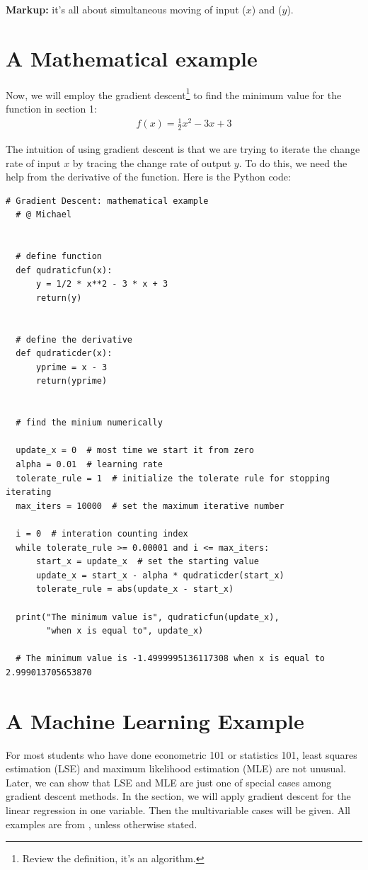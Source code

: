 \documentclass[12pt]{article}
\theoremstyle{definition}
\numberwithin{equation}{section}
\numberwithin{figure}{section}
\numberwithin{table}{section}
\begin{document}
\textbf{Markup:} it's all about simultaneous moving of input ($x$) and ($y$).

\section{A Mathematical example}

Now, we will employ the gradient descent\footnote{Review the definition, it's an algorithm.} to find the minimum value for the function in section 1:
\begin{align*}
  f(x) = \frac{1}{2} x^2 - 3x + 3
\end{align*}

The intuition of using gradient descent is that we are trying to iterate the change rate of input $x$ by tracing the change rate of output $y$. To do this, we need the help from the derivative of the function. Here is the Python code:
\begin{lstlisting}[caption = Gradient Descent Math Example]
  # Gradient Descent: mathematical example
  # @ Michael


  # define function
  def qudraticfun(x):
      y = 1/2 * x**2 - 3 * x + 3
      return(y)


  # define the derivative
  def qudraticder(x):
      yprime = x - 3
      return(yprime)


  # find the minium numerically

  update_x = 0  # most time we start it from zero
  alpha = 0.01  # learning rate
  tolerate_rule = 1  # initialize the tolerate rule for stopping iterating
  max_iters = 10000  # set the maximum iterative number

  i = 0  # interation counting index
  while tolerate_rule >= 0.00001 and i <= max_iters:
      start_x = update_x  # set the starting value
      update_x = start_x - alpha * qudraticder(start_x)
      tolerate_rule = abs(update_x - start_x)

  print("The minimum value is", qudraticfun(update_x),
        "when x is equal to", update_x)

  # The minimum value is -1.4999995136117308 when x is equal to 2.999013705653870
\end{lstlisting}

\section{A Machine Learning Example}

For most students who have done econometric 101 or statistics 101, least squares estimation (LSE) and maximum likelihood estimation (MLE) are not unusual. Later, we can show that LSE and MLE are just one of special cases among gradient descent methods. In the section, we will apply gradient descent for the linear regression in one variable. Then the multivariable cases will be given. All examples are from \cite{ng2014cs229}, unless otherwise stated.
\end{document}
